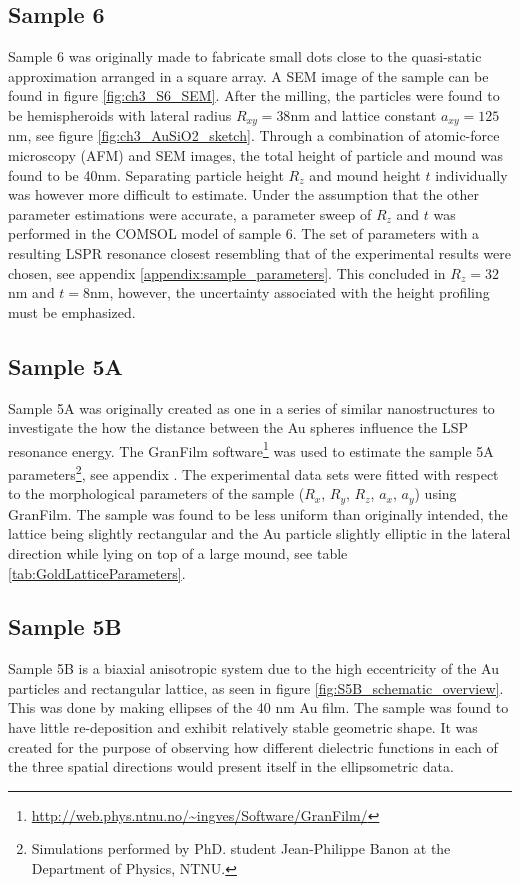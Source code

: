 \subsection{Sample 6}
Sample 6 was originally made to fabricate small dots close to the quasi-static approximation arranged in a square array. A SEM image of the sample can be found in figure \ref{fig:ch3_S6_SEM}. After the milling, the particles were found to be hemispheroids with lateral radius $R_{xy} = 38$nm and lattice constant $a_{xy} = 125$nm, see figure \ref{fig:ch3_AuSiO2_sketch}. Through a combination of atomic-force microscopy (AFM) and SEM images, the total height of particle and mound was found to be 40nm. Separating particle height $R_z$ and mound height $t$ individually was however more difficult to estimate. Under the assumption that the other parameter estimations were accurate, a parameter sweep of $R_z$ and $t$ was performed in the COMSOL model of sample 6. The set of parameters with a resulting LSPR resonance closest resembling that of the experimental results were chosen, see appendix \ref{appendix:sample_parameters}. This concluded in $R_z=32$nm and $t=8$nm, however, the uncertainty associated with the height profiling must be emphasized.

\subsection{Sample 5A}
Sample 5A was originally created as one in a series of similar nanostructures to investigate the how the distance between the Au spheres influence the LSP resonance energy. The GranFilm software\footnote{\url{http://web.phys.ntnu.no/~ingves/Software/GranFilm/}} was used to estimate the sample 5A parameters\footnote{Simulations performed by PhD. student Jean-Philippe Banon at the Department of Physics, NTNU.}, see appendix . The experimental data sets were fitted with respect to the morphological parameters of the sample ($R_x$, $R_y$, $R_z$, $a_x$, $a_y$) using GranFilm\cite{Kildemo2017}. The sample was found to be less uniform than originally intended, the lattice being slightly rectangular and the Au particle slightly elliptic in the lateral direction while lying on top of a large mound, see table \ref{tab:GoldLatticeParameters}. 

\subsection{Sample 5B}
Sample 5B is a biaxial anisotropic system due to the high eccentricity of the Au particles and rectangular lattice, as seen in figure \ref{fig:S5B_schematic_overview}. This was done by making ellipses of the 40 nm Au film. The sample was found to have little re-deposition and exhibit relatively stable geometric shape\cite{brakstad_thesis}. It was created for the purpose of observing how different dielectric functions in each of the three spatial directions would present itself in the ellipsometric data. 

